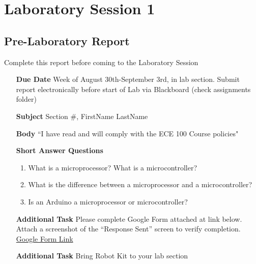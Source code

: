 \chapter{Laboratory Session 1}
\section{Pre-Laboratory Report}
Complete this report before coming to the Laboratory Session

\begin{itemize}
	
	\item[\textbf{Due Date}]{Week of August 30th-September 3rd, \the\year \space in lab section. Submit report electronically before start of Lab via Blackboard (check assignments folder)}
	\item[\textbf{Subject}]{Section \#, FirstName LastName}
	\item[\textbf{Body}]{``I have read and will comply with the ECE 100 Course policies"}
	\item[\textbf{Short Answer Questions}]{
		\begin{enumerate}
			\item{What is a microprocessor? What is a microcontroller?}
			\item{What is the difference between a microprocessor and a microcontroller?}
			\item{Is an Arduino a microprocessor or microcontroller?}
		\end{enumerate}
	}
	\item[\textbf{Additional Task}]{Please complete Google Form attached at link below. Attach a screenshot of the “Response Sent” screen to verify completion. \href{https://docs.google.com/forms/d/1YDT2DtzWYms2BeuS1Wrks3ZANfYgNUmNhEl2PUm63Qc/prefill}{Google Form Link}}
	\item[\textbf{Additional Task}]{Bring Robot Kit to your lab section}
\end{itemize}
